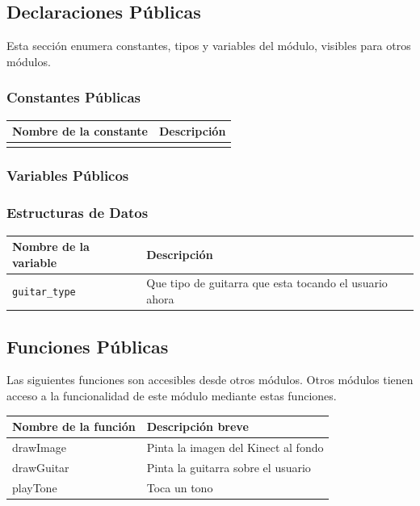 \documentclass[a4paper,10pt]{article}
\begin{document}
\subsection{Declaraciones Públicas}
Esta sección enumera constantes, tipos y variables del módulo, visibles para
otros módulos.
\subsubsection{Constantes Públicas}
\begin{tabular}{| p{30mm} | p{10cm} |}
        \hline
        \textbf{Nombre de la \mbox{constante}} & \textbf{Descripción} \\
        \hline
         & \\
        \hline
\end{tabular}
                

\subsubsection{Variables Públicos}
\subsubsection{Estructuras de Datos}
\begin{tabular}{| p{30mm} | p{10cm} |}
        \hline
        \textbf{Nombre de la \mbox{variable}} & \textbf{Descripción} \\
        \hline
        \texttt{guitar\_type} & Que tipo de guitarra que esta tocando el usuario ahora\\
        \hline
\end{tabular}
\subsection{Funciones Públicas}
Las siguientes funciones son accesibles desde otros módulos. Otros módulos
tienen acceso a la funcionalidad de este módulo mediante estas funciones.~\\

\begin{tabular}{| p{30mm} | p{10cm} |}
        \hline
        \textbf{Nombre de la \mbox{función}} & \textbf{Descripción breve} \\
        \hline
        drawImage & Pinta la imagen del Kinect al fondo \\
        \hline
        drawGuitar & Pinta la guitarra sobre el usuario \\
        \hline
        playTone & Toca un tono \\
        \hline
\end{tabular}
\end{document}
